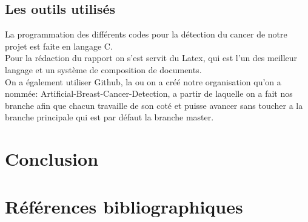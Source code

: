 \documentclass[a4paper,12pt]{report}
\begin{document}
\section{Les outils utilisés}
La programmation des différents codes pour la détection du cancer de notre projet est faite en langage C.\\
Pour la rédaction du rapport on s'est servit du Latex, qui est l'un des meilleur langage et un système de composition de documents.\\

On a également utiliser Github, la ou on a créé notre organisation qu'on a nommée: Artificial-Breast-Cancer-Detection, a partir de laquelle on a fait nos branche afin que chacun travaille de son coté et puisse avancer sans toucher a la branche principale qui est par défaut la branche master. 


\chapter*{Conclusion}


\chapter*{Références bibliographiques}
\end{document}
